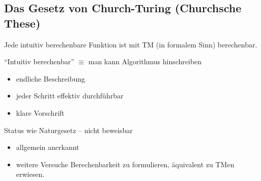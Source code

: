 \subsection{Das Gesetz von Church-Turing (Churchsche These)} %
\begin{Satz}[name={[Intuitiv berechenbare Funktionen sind mit \acs*{TM} berechenbar]}]
	Jede intuitiv berechenbare Funktion ist mit \ac{TM} (in formalem Sinn) berechenbar.
	
	"`Intuitiv berechenbar"' $\equiv$ man kann Algorithmus hinschreiben
	\begin{itemize}
		\item endliche Beschreibung
		\item jeder Schritt effektiv durchführbar
		\item klare Vorschrift
	\end{itemize}
	Status wie Naturgesetz -- nicht beweisbar
	\begin{itemize}[label=\->]
		\item allgemein anerkannt
		\item weitere Versuche Berechenbarkeit zu formulieren, äquivalent zu \ac{TM}en erwiesen.
	\end{itemize}
\end{Satz}

